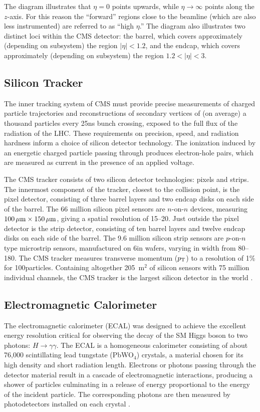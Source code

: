 The diagram illustrates that $\eta = 0$ points upwards, while $\eta \to \infty$ points along the $z$-axis.
For this reason the ``forward'' regions close to the beamline (which are also less instrumented) are referred to as ``high $\eta$.''
The diagram also illustrates two distinct loci within the CMS detector: the barrel, which covers approximately (depending on subsystem) the region $|\eta| < 1.2$, and the endcap, which covers approximately (depending on subsystem) the region $1.2 < |\eta| < 3$.

\subsection{Silicon Tracker}
The inner tracking system of CMS must provide precise measurements of charged particle trajectories and reconstructions of secondary vertices of (on average) a thousand particles every 25\unit{ns} bunch crossing, exposed to the full flux of the radiation of the LHC.
These requirements on precision, speed, and radiation hardness inform a choice of silicon detector technology.
The ionization induced by an energetic charged particle passing through produces electron-hole pairs, which are measured as current in the presence of an applied voltage.

The CMS tracker consists of two silicon detector technologies: pixels and strips.
The innermost component of the tracker, closest to the collision point, is the pixel detector, consisting of three barrel layers and two endcap disks on each side of the barrel.
The 66 million silicon pixel sensors are $n$-on-$n$ devices, measuring $100 \,\mu\text{m} \times 150 \,\mu\text{m}$, giving a spatial resolution of 15--20\mum.
Just outside the pixel detector is the strip detector, consisting of ten barrel layers and twelve endcap disks on each side of the barrel.
The 9.6 million silicon strip sensors are $p$-on-$n$ type microstrip sensors, manufactured on 6\unit{in} wafers, varying in width from 80--180\mum.
The CMS tracker measures transverse momentum ($p_{\mathrm{T}}$) to a resolution of 1\% for 100\GeV particles.
Containing altogether 205~$\text{m}^2$ of silicon sensors with 75 million individual channels, the CMS tracker is the largest silicon detector in the world \cite{Chatrchyan:2008zzk, CERN-LHCC-98-006, HARTMANN201225}.


\subsection{Electromagnetic Calorimeter}
The electromagnetic calorimeter (ECAL) was designed to achieve the excellent energy resolution critical for observing the decay of the SM Higgs boson to two photons: $H \to \gamma\gamma$.
The ECAL is a homogeneous calorimeter consisting of about 76,000 scintillating lead tungstate (PbWO$_4$) crystals, a material chosen for its high density and short radiation length.
Electrons or photons passing through the detector material result in a cascade of electromagnetic interactions, producing a shower of particles culminating in a release of energy proportional to the energy of the incident particle.
The corresponding photons are then measured by photodetectors installed on each crystal \cite{Chatrchyan:2008zzk, CERN-LHCC-97-033, Fabjan:692252}.

